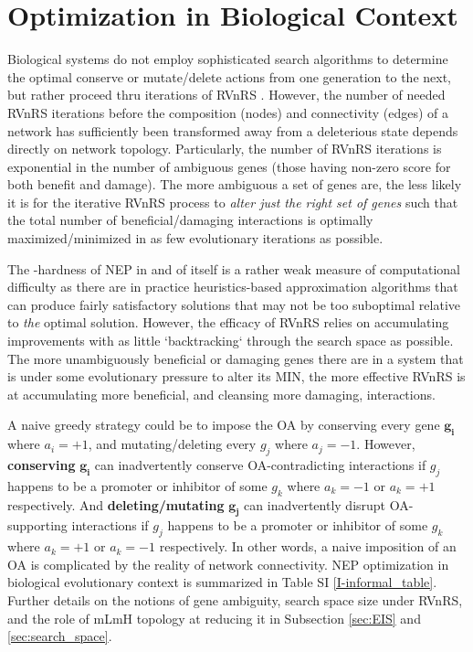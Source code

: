 \section{Optimization in Biological Context}\label{opt_in_bio_context}
    Biological systems do not employ sophisticated search algorithms to determine the optimal conserve or mutate/delete actions from one generation to the next, but rather proceed thru iterations of RVnRS \cite{carvunis_proto-genes_2012}. However, the number of needed RVnRS iterations before the composition (nodes) and connectivity (edges) of a network has sufficiently been transformed away from a deleterious state depends directly on network topology.
    Particularly, the number of RVnRS iterations is exponential in the number of ambiguous genes (those having non-zero score for both benefit and damage).
    The more ambiguous a set of genes are, the less likely it is for the iterative RVnRS process to \textit{alter just the right set of genes} such that the total number of beneficial/damaging interactions is optimally maximized/minimized in as few evolutionary iterations as possible.

    The -hardness of NEP in and of itself is a rather weak measure of computational difficulty as there are in practice heuristics-based approximation algorithms that can produce fairly satisfactory solutions that may not be too suboptimal relative to \textit{the} optimal solution.
    However, the efficacy of RVnRS relies on accumulating improvements with as little `backtracking` through the search space as possible. The more unambiguously beneficial or damaging genes there are in a system that is under some evolutionary pressure to alter its MIN, the more effective RVnRS is at accumulating more beneficial, and cleansing more damaging, interactions.

    A naive greedy strategy could be to impose the OA by conserving every gene $\boldsymbol{g_i}$ where $a_i = +1$, and mutating/deleting every $g_j$ where $a_j=-1$. However, \textbf{conserving} $\boldsymbol{g_i}$ can inadvertently conserve OA-contradicting interactions if $g_j$ happens to be a promoter or inhibitor of some $g_k$ where $a_k=-1$ or $a_k=+1$ respectively. And \textbf{deleting/mutating} $\boldsymbol{g_j}$ can inadvertently disrupt OA-supporting interactions if $g_j$ happens to be a promoter or inhibitor of some $g_k$ where $a_k=+1$ or $a_k=-1$ respectively. In other words, a naive imposition of an OA is complicated by the reality of network connectivity. NEP optimization in biological evolutionary context is summarized in Table SI \ref{I-informal_table}. Further details on the notions of gene ambiguity, search space size under RVnRS, and the role of mLmH topology at reducing it in Subsection \ref{sec:EIS} and \ref{sec:search_space}.
